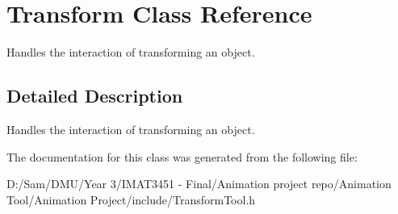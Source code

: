 \hypertarget{class_transform}{}\section{Transform Class Reference}
\label{class_transform}


Handles the interaction of transforming an object.  




\subsection{Detailed Description}
Handles the interaction of transforming an object. 

The documentation for this class was generated from the following file\+:\begin{DoxyCompactItemize}
\item 
D\+:/\+Sam/\+D\+M\+U/\+Year 3/\+I\+M\+A\+T3451 -\/ Final/\+Animation project repo/\+Animation Tool/\+Animation Project/include/Transform\+Tool.\+h\end{DoxyCompactItemize}
